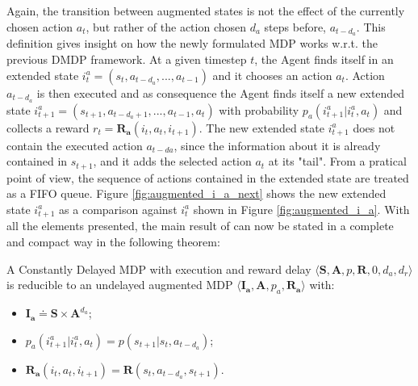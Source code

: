                 \noindent
                Again, the transition between augmented states is not the effect of the currently chosen action $a_t$, but rather of the action chosen $d_{a}$ steps before, $a_{t-d_{a}}$. This definition gives insight on how the newly formulated MDP works w.r.t. the previous DMDP framework. At a given timestep $t$, the Agent finds itself in an extended state $i_t^{a} = \left( s_t, a_{t-d_{a}}, ..., a_{t-1} \right)$ and it chooses an action $a_t$. Action $a_{t-d_{a}}$ is then executed and as consequence  the Agent finds itself a new extended state $i_{t+1}^{a} = \left( s_{t+1}, a_{t-d_{a}+1}, ..., a_{t-1}, a_{t} \right)$ with probability $p_a \left( i_{t+1}^a | i_t^a , a_t  \right)$ and collects a reward $r_t = \mathbf{R_{a}}\left( i_t, a_{t}, i_{t+1} \right)$. The new extended state $i_{t+1}^{a}$ does not contain the executed action $a_{t-d{a}}$, since the information about it is already contained in $s_{t+1}$, and it adds the selected action $a_t$ at its "tail". From a pratical point of view, the sequence of actions contained in the extended state are treated as a FIFO queue. Figure \ref{fig:augmented_i_a_next} shows the new extended state $i_{t+1}^{a}$ as a comparison against $i_t^{a}$ shown in Figure \ref{fig:augmented_i_a}.
                With all the elements presented, the main result of  can now be stated in a complete and compact way in the following theorem:
            
                \begin{theorem}
                    \label{th:dmdpexecred}
                    A Constantly Delayed MDP with execution and reward delay $\langle \mathbf{S}, \mathbf{A}, p, \mathbf{R}, 0, d_a, d_r \rangle$ is reducible to an undelayed augmented MDP $\langle \mathbf{I_a}, \mathbf{A}, p_a, \mathbf{R_a} \rangle$ with: 
                    \begin{itemize}[topsep=0.5em, partopsep=0.5em]
                        \setlength\itemsep{0em}
                        \item $\mathbf{I_{a}} \doteq \mathbf{S} \times \mathbf{A}^{d_a}$;
                        \item $p_a \left( i_{t+1}^a | i_t^a , a_t  \right) = p \left( s_{t+1} | s_t, a_{t-d_{a}} \right)$;
                        \item $\mathbf{R_{a}}\left( i_t, a_{t}, i_{t+1} \right) = \mathbf{R} \left( s_t, a_{t-d_{a}}, s_{t+1} \right)$.
                    \end{itemize}
                \end{theorem}
                
